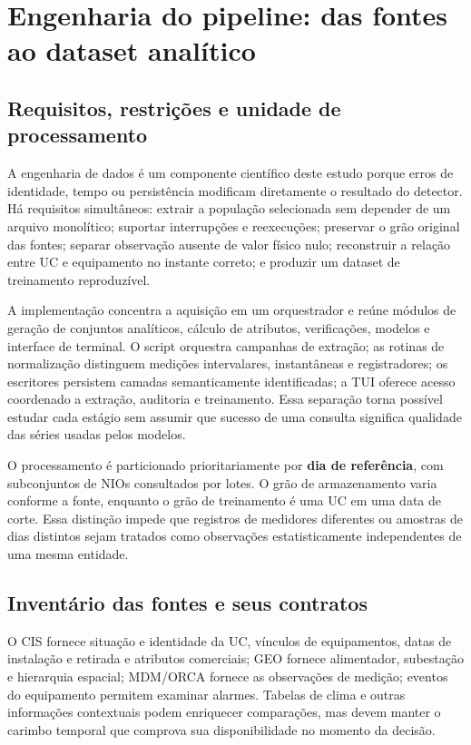\chapter{Engenharia do pipeline: das fontes ao dataset analítico}\label{engenharia-do-pipeline-das-fontes-ao-dataset-analuxedtico}

\section{Requisitos, restrições e unidade de processamento}\label{requisitos-restriuxe7uxf5es-e-unidade-de-processamento}

A engenharia de dados é um componente científico deste estudo porque erros de identidade, tempo ou persistência modificam diretamente o resultado do detector. Há requisitos simultâneos: extrair a população selecionada sem depender de um arquivo monolítico; suportar interrupções e reexecuções; preservar o grão original das fontes; separar observação ausente de valor físico nulo; reconstruir a relação entre UC e equipamento no instante correto; e produzir um dataset de treinamento reproduzível.

A implementação concentra a aquisição em um orquestrador e reúne módulos de geração de conjuntos analíticos, cálculo de atributos, verificações, modelos e interface de terminal. O script orquestra campanhas de extração; as rotinas de normalização distinguem medições intervalares, instantâneas e registradores; os escritores persistem camadas semanticamente identificadas; a TUI oferece acesso coordenado a extração, auditoria e treinamento. Essa separação torna possível estudar cada estágio sem assumir que sucesso de uma consulta significa qualidade das séries usadas pelos modelos.

O processamento é particionado prioritariamente por \textbf{dia de referência}, com subconjuntos de NIOs consultados por lotes. O grão de armazenamento varia conforme a fonte, enquanto o grão de treinamento é uma UC em uma data de corte. Essa distinção impede que registros de medidores diferentes ou amostras de dias distintos sejam tratados como observações estatisticamente independentes de uma mesma entidade.

\section{Inventário das fontes e seus contratos}\label{inventuxe1rio-das-fontes-e-seus-contratos}

O CIS fornece situação e identidade da UC, vínculos de equipamentos, datas de instalação e retirada e atributos comerciais; GEO fornece alimentador, subestação e hierarquia espacial; MDM/ORCA fornece as observações de medição; eventos do equipamento permitem examinar alarmes. Tabelas de clima e outras informações contextuais podem enriquecer comparações, mas devem manter o carimbo temporal que comprova sua disponibilidade no momento da decisão.

